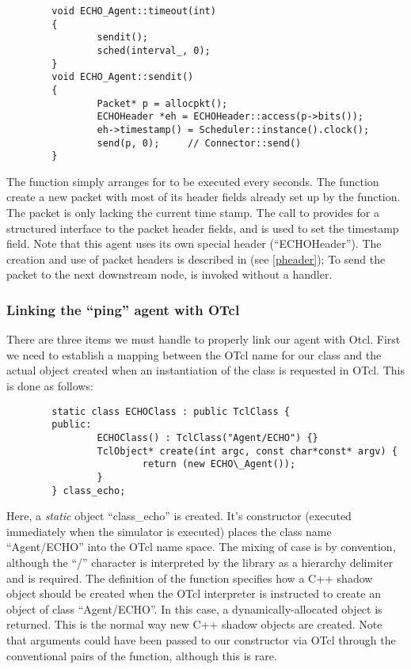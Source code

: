 \begin{small}
\begin{verbatim}
        void ECHO_Agent::timeout(int)
        {
                sendit();
                sched(interval_, 0);
        }
        void ECHO_Agent::sendit()
        {
                Packet* p = allocpkt();
                ECHOHeader *eh = ECHOHeader::access(p->bits());
                eh->timestamp() = Scheduler::instance().clock();
                send(p, 0);     // Connector::send()
        }
\end{verbatim}
\end{small}

The  function simply arranges for  to be
executed every  seconds.
The  function create a new packet with most of its
header fields already set up by the  function.
The packet is only lacking the current time stamp. 
The call to  provides for a structured interface to the
packet header fields, and is used to set the timestamp field.
Note that this agent uses its own special header (``ECHOHeader'').
The creation and use of packet headers is described in (see \ref{pheader});
To send the packet to the next downstream node, 
is invoked without a handler.

\subsubsection{Linking the ``ping'' agent with OTcl}

There are three items we must handle to properly link our agent
with Otcl.
First we need to establish a mapping between the OTcl name
for our class and the actual object created when an
instantiation of the class is requested in OTcl.
This is done as follows:
\begin{small}
\begin{verbatim}
        static class ECHOClass : public TclClass {
        public:
                ECHOClass() : TclClass("Agent/ECHO") {}
                TclObject* create(int argc, const char*const* argv) {
                        return (new ECHO\_Agent());
                }
        } class_echo;
\end{verbatim}
\end{small}

Here, a {\em static} object ``class\_echo'' is created. It's constructor
(executed immediately when the simulator is executed) places the class name
``Agent/ECHO'' into the OTcl name space.  The mixing of case is
by convention, although the ``/'' character is interpreted by the
 library as a hierarchy delimiter and is required.
The definition of the  function specifies how a C++
shadow object should be created when
the OTcl interpreter is instructed to create an
object of class ``Agent/ECHO''.  In this case, a dynamically-allocated
object is returned.  This is the normal way new C++ shadow objects
are created.
Note that arguments could have been passed to our constructor
via OTcl through the conventional  pairs of the
 function, although this is rare.

